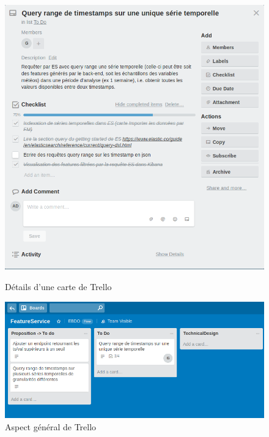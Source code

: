 \documentclass[a4paper]{article}
\begin{document}
\begin{figure}[!htb]
   \begin{minipage}{0.48\textwidth}
     \centering
     \includegraphics[width=.7\linewidth]{./tmp/CarteTrello.png}
	   \caption{Détails d'une carte de Trello\label{CarteTrello}} 
   \end{minipage}\hfill
   \begin {minipage}{0.48\textwidth}
     \centering
     \includegraphics[width=.7\linewidth]{./tmp/Trello.png}
	\caption{Aspect général de Trello\label{TabTrello}}
   \end{minipage}
\end{figure}

\newpage
\end{document}

